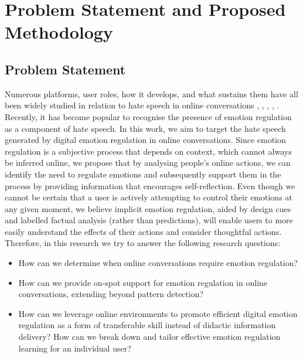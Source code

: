 \documentclass[acmtog]{acmart}
\begin{document}
\section{Problem Statement and Proposed Methodology}
\subsection{Problem Statement}
Numerous platforms, user roles, how it develops, and what sustains them have all been widely studied in relation to hate speech in online conversations \cite{solovev2022moral}, \cite{saveski2021structure}, \cite{majo2020volume}, \cite{guberman2016quantifying}, \cite{konikoff2021gatekeepers}. Recently, it has become popular to recognise the presence of emotion regulation as a component of hate speech. In this work, we aim to target the hate speech generated by digital emotion regulation in online conversations. Since emotion regulation is a subjective process that depends on context, which cannot always be inferred online, we propose that by analysing people's online actions, we can identify the need to regulate emotions and subsequently support them in the process by providing information that encourages self-reflection. Even though we cannot be certain that a user is actively attempting to control their emotions at any given moment, we believe implicit emotion regulation, aided by design cues and labelled factual analysis (rather than predictions), will enable users to more easily understand the effects of their actions and consider thoughtful actions. Therefore, in this research we try to answer the following research questions:
\begin{itemize}
    \item How can we determine when online conversations require emotion regulation?
    \item How can we provide on-spot support for emotion regulation in online conversations, extending beyond pattern detection?
    \item How can we leverage online environments to promote efficient digital emotion regulation as a form of transferable skill instead of didactic information delivery? How can we break down and tailor effective emotion regulation learning for an individual user?
\end{itemize}



\end{document}
